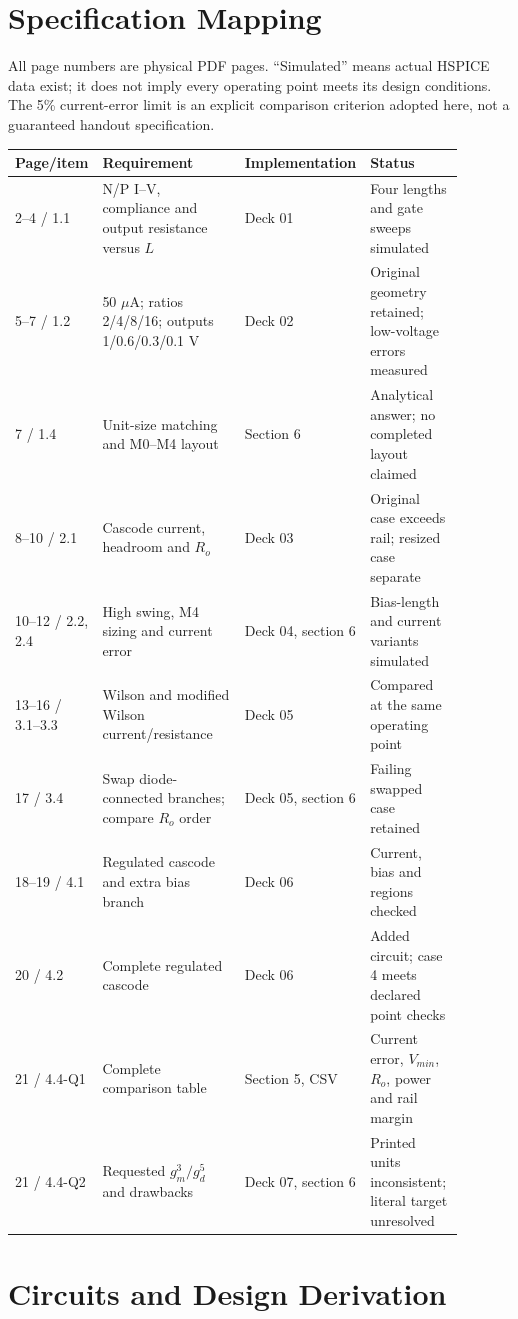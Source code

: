 \section{Specification Mapping}
All page numbers are physical PDF pages. ``Simulated'' means actual HSPICE data exist; it does not imply every operating point meets its design conditions. The 5\% current-error limit is an explicit comparison criterion adopted here, not a guaranteed handout specification.
\begin{longtable}{p{0.12\linewidth}p{0.38\linewidth}p{0.17\linewidth}p{0.22\linewidth}}
\toprule
Page/item & Requirement & Implementation & Status \\
\midrule\endhead
2--4 / 1.1 & N/P I--V, compliance and output resistance versus $L$ & Deck 01 & Four lengths and gate sweeps simulated \\
5--7 / 1.2 & 50 $\mu$A; ratios 2/4/8/16; outputs 1/0.6/0.3/0.1 V & Deck 02 & Original geometry retained; low-voltage errors measured \\
7 / 1.4 & Unit-size matching and M0--M4 layout & Section 6 & Analytical answer; no completed layout claimed \\
8--10 / 2.1 & Cascode current, headroom and $R_o$ & Deck 03 & Original case exceeds rail; resized case separate \\
10--12 / 2.2, 2.4 & High swing, M4 sizing and current error & Deck 04, section 6 & Bias-length and current variants simulated \\
13--16 / 3.1--3.3 & Wilson and modified Wilson current/resistance & Deck 05 & Compared at the same operating point \\
17 / 3.4 & Swap diode-connected branches; compare $R_o$ order & Deck 05, section 6 & Failing swapped case retained \\
18--19 / 4.1 & Regulated cascode and extra bias branch & Deck 06 & Current, bias and regions checked \\
20 / 4.2 & Complete regulated cascode & Deck 06 & Added circuit; case 4 meets declared point checks \\
21 / 4.4-Q1 & Complete comparison table & Section 5, CSV & Current error, $V_{min}$, $R_o$, power and rail margin \\
21 / 4.4-Q2 & Requested $g_m^3/g_d^5$ and drawbacks & Deck 07, section 6 & Printed units inconsistent; literal target unresolved \\
\bottomrule
\end{longtable}

\section{Circuits and Design Derivation}
